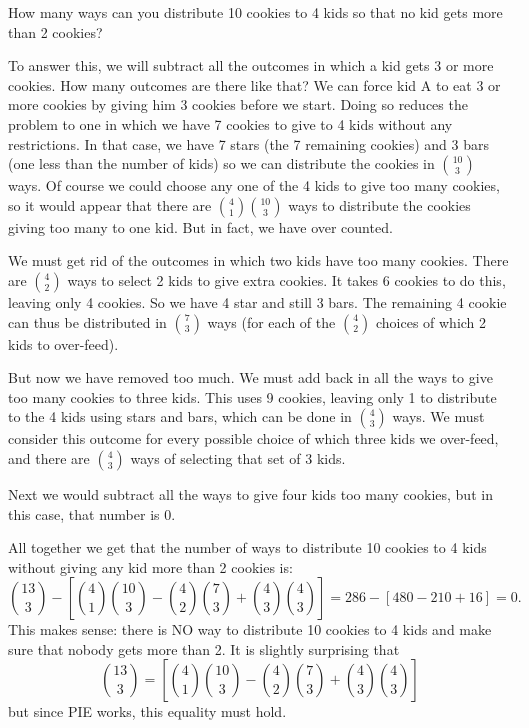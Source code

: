 \documentclass[12pt]{article}
\begin{document}
\begin{example}
How many ways can you distribute 10 cookies to 4 kids so that no kid gets more than 2 cookies?  

\begin{solution}
To answer this, we will subtract all the outcomes in which a kid gets 3 or more cookies.  How many outcomes are there like that?  We can force kid A to eat 3 or more cookies by giving him 3 cookies before we start.  Doing so reduces the problem to one in which we have 7 cookies to give to 4 kids without any restrictions.  In that case, we have 7 stars (the 7 remaining cookies) and 3 bars (one less than the number of kids) so we can distribute the cookies in ${10 \choose 3}$ ways.  Of course we could choose any one of the 4 kids to give too many cookies, so it would appear that there are ${4 \choose 1}{10 \choose 3}$ ways to distribute the cookies giving too many to one kid.  But in fact, we have over counted.  

We must get rid of the outcomes in which two kids have too many cookies.  There are ${4 \choose 2}$ ways to select 2 kids to give extra cookies.  It takes 6 cookies to do this, leaving only 4 cookies.  So we have 4 star and still 3 bars.  The remaining 4 cookie can thus be distributed in ${7 \choose 3}$ ways (for each of the ${4 \choose 2}$ choices of which 2 kids to over-feed).  

But now we have removed too much.  We must add back in all the ways to give too many cookies to three kids.  This uses 9 cookies, leaving only 1 to distribute to the 4 kids using stars and bars, which can be done in ${4 \choose 3}$ ways.  We must consider this outcome for every possible choice of which three kids we over-feed, and there are ${4 \choose 3}$ ways of selecting that set of 3 kids.

Next we would subtract all the ways to give four kids too many cookies, but in this case, that number is 0.

All together we get that the number of ways to distribute 10 cookies to 4 kids without giving any kid more than 2 cookies is:
\[{13 \choose 3} - \left[{4 \choose 1}{10 \choose 3} - {4 \choose 2}{7 \choose 3} + {4\choose 3}{4\choose 3}\right] = 286 - [480 - 210 + 16] = 0.\]
This makes sense: there is NO way to distribute 10 cookies to 4 kids and make sure that nobody gets more than 2.  It is slightly surprising that \[{13 \choose 3} = \left[{4 \choose 1}{10 \choose 3} - {4 \choose 2}{7 \choose 3} + {4\choose 3}{4\choose 3}\right]\] but since PIE works, this equality must hold.
\end{solution}
\end{example}
\end{document}

